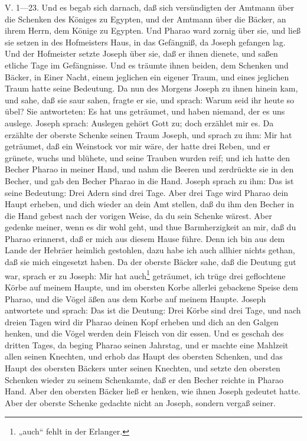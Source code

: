 V. 1—23. Und es begab sich darnach, daß sich versündigten der Amtmann über die Schenken des Königes zu Egypten, und der Amtmann über die Bäcker, an ihrem Herrn, dem Könige zu Egypten. Und Pharao ward zornig über sie, und ließ sie setzen in des Hofmeisters Haus, in das Gefängniß, da Joseph gefangen lag. Und der Hofmeister setzte Joseph über sie, daß er ihnen dienete, und saßen etliche Tage im Gefängnisse. Und es träumte ihnen beiden, dem Schenken und Bäcker, in Einer Nacht, einem jeglichen ein eigener Traum, und eines jeglichen Traum hatte seine Bedeutung. Da nun des Morgens Joseph zu ihnen hinein kam, und sahe, daß sie saur sahen, fragte er sie, und sprach: Warum seid ihr heute so übel? Sie antworteten: Es hat uns geträumet, und haben niemand, der es uns auslege. Joseph sprach: Auslegen gehört Gott zu; doch erzählet mir es. Da erzählte der oberste Schenke seinen Traum Joseph, und sprach zu ihm: Mir hat geträumet, daß ein Weinstock vor mir wäre, der hatte drei Reben, und er grünete, wuchs und blühete, und seine Trauben wurden reif; und ich hatte den Becher Pharao in meiner Hand, und nahm die Beeren und zerdrückte sie in den Becher, und gab den Becher Pharao in die Hand. Joseph
sprach zu ihm: Das ist seine Bedeutung: Drei Adern sind drei Tage. Aber drei Tage wird Pharao dein Haupt erheben, und dich wieder an dein Amt stellen, daß du ihm den Becher in die Hand gebest nach der vorigen Weise, da du sein Schenke wärest. Aber gedenke meiner, wenn es dir wohl geht, und thue Barmherzigkeit an mir, daß du Pharao erinnerst, daß er mich aus diesem Hause führe. Denn ich bin aus dem Lande der Hebräer heimlich gestohlen, dazu habe ich auch allhier nichts gethan, daß sie mich eingesetzt haben. Da der oberste Bäcker sahe, daß die Deutung gut war, sprach er zu Joseph: Mir hat auch\footnote{„auch“ fehlt in der Erlanger.} geträumet, ich trüge drei geflochtene Körbe auf meinem Haupte, und im obersten Korbe allerlei gebackene Speise dem Pharao, und die Vögel äßen aus dem Korbe auf meinem Haupte. Joseph antwortete und sprach: Das ist die Deutung: Drei Körbe sind drei Tage, und nach dreien Tagen wird dir Pharao deinen Kopf erheben und dich an den Galgen henken, und die Vögel werden dein Fleisch von dir essen. Und es geschah des dritten Tages, da beging Pharao seinen Jahrstag, und er machte eine Mahlzeit allen seinen Knechten, und erhob das Haupt des obersten Schenken, und das Haupt des obersten Bäckers unter seinen Knechten, und setzte den obersten Schenken wieder zu seinem Schenkamte, daß er den Becher reichte in Pharao Hand. Aber den obersten Bäcker ließ er henken, wie ihnen Joseph gedeutet hatte. Aber der oberste Schenke gedachte nicht an Joseph, sondern vergaß seiner.

